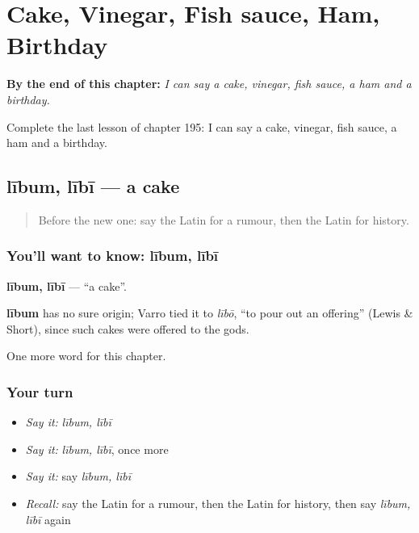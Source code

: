 
\chapter{Cake, Vinegar, Fish sauce, Ham, Birthday}
\label{ch:la-cake-vinegar-fish-sauce-ham-birthday}

\begin{chapteropening}
\textbf{By the end of this chapter:} \emph{I can say a cake, vinegar, fish sauce, a ham and a birthday.}

Complete the last lesson of chapter 195: I can say a cake, vinegar, fish sauce, a ham and a birthday.
\end{chapteropening}

\section[lībum, lībī]{lībum, lībī — a cake}

\label{lesson:LA-C195-libum}



\begin{quote}
Before the new one: say the Latin for a rumour, then the Latin for history.
\end{quote}

\subsection*{You'll want to know: lībum, lībī}
\textbf{lībum, lībī} — \textquotedblleft{}a cake\textquotedblright{}.

\begin{cousinweb}
\textbf{lībum} has no sure origin; Varro tied it to \emph{lībō}, \textquotedblleft{}to pour out an offering\textquotedblright{} (Lewis \& Short), since such cakes were offered to the gods.
\end{cousinweb}

\begin{grammarlens}[title={What you've built}]
One more word for this chapter.
\end{grammarlens}

\subsection*{Your turn}
\begin{itemize}
\raggedright
  \item \emph{Say it:} \emph{lībum, lībī}
  \item \emph{Say it:} \emph{lībum, lībī}, once more
  \item \emph{Say it:} say \emph{lībum, lībī}
  \item \emph{Recall:} say the Latin for a rumour, then the Latin for history, then say \emph{lībum, lībī} again
\end{itemize}

